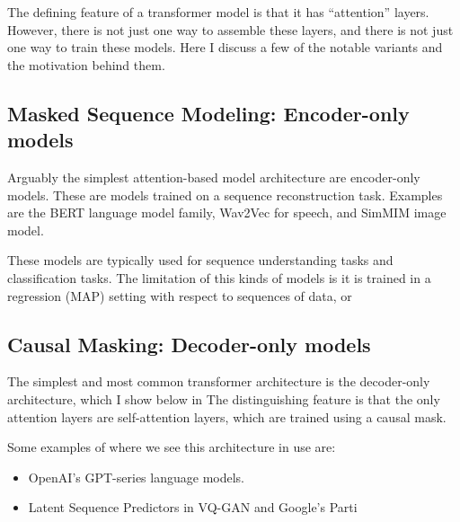 The defining feature of a transformer model is that it has ``attention'' layers. However, there is not just one way to assemble these layers, and there is not just one way to train these models. Here I discuss a few of the notable variants and the motivation behind them.

\subsection{Masked Sequence Modeling: Encoder-only models}
\label{ss:msm}

Arguably the simplest attention-based model architecture are encoder-only models. These are models trained on a sequence reconstruction task. Examples are the BERT \cite{bert} language model family, Wav2Vec \cite{wav2vec} for speech, and SimMIM \cite{SimMIM} image model.

These models are typically used for sequence understanding tasks and classification tasks. The limitation of this kinds of models is it is trained in a regression (MAP) setting with respect to sequences of data, or

\subsection{Causal Masking: Decoder-only models}
\label{ss:decoder-only}


The simplest and most common transformer architecture is the decoder-only architecture, which I show below in  The distinguishing feature is that the only attention layers are self-attention layers, which are trained using a causal mask.

Some examples of where we see this architecture in use are:
\begin{itemize}
    \item OpenAI's GPT-series \cite{gpt1, gpt2, gpt3} language models.
    \item Latent Sequence Predictors in VQ-GAN \cite{vqgan} and Google's Parti \cite{parti}
\end{itemize}





